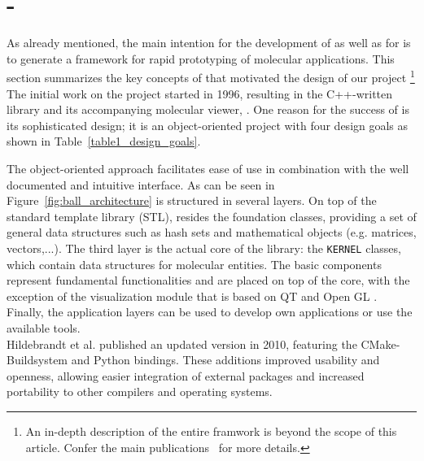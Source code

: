 \section{\ball -  \ballFull}
\label{sec:ball}
As already mentioned, the main intention for the development of \ball as well as for \biochem is to generate a framework for rapid prototyping of molecular applications. This section summarizes the key concepts of \ball that motivated the design of our project \footnote{An in-depth description of the entire \ball framwork is beyond the scope of this article. Confer the main publications~\cite{kohlbacher_ballrapid_2000, hildebrandt_ball_2010}  for more details.}\\
The initial work on the \ball project started in 1996, resulting in the C++-written library \ball and its accompanying molecular viewer, \textit{\ballview}. One reason for the success of \ball is its sophisticated design; it is an  object-oriented project with four design goals as shown in Table~\ref{table1_design_goals}.

\begin{table}

	\label{table1_design_goals}
\end{table}

The object-oriented approach facilitates ease of use in combination with the well documented and intuitive interface. As can be seen in Figure~\ref{fig:ball_architecture} \ball is structured in several layers. On top of the standard template library (STL), resides the foundation classes, providing a set of general data structures such as hash sets and mathematical objects (e.g. matrices, vectors,...). The third layer is the actual core of the library: the \texttt{KERNEL} classes, which contain data structures for molecular entities. The basic components represent fundamental functionalities and are placed on top of the core, with the exception of the visualization module that is based on QT and Open GL \cite{qt,OpenGLWebsite} . Finally, the application layers can be used to develop own applications or use the available tools. \\
Hildebrandt et al. published an updated version in 2010, featuring the CMake-Buildsystem and Python bindings. These additions improved usability and openness, allowing easier integration of external packages and increased portability to other compilers and operating systems. \\

